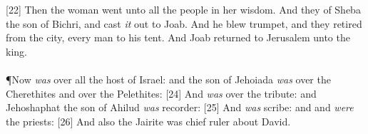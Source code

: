 [22] \textcolor[cmyk]{0.99998,1,0,0}{Then the woman went unto all the people in her wisdom. And they  of Sheba the son of Bichri, and cast \emph{it} out to Joab. And he blew  trumpet, and they retired from the city, every man to his tent. And Joab returned to Jerusalem unto the king.}\\
\\
\P \textcolor[cmyk]{0.99998,1,0,0}{Now  \emph{was} over all the host of Israel: and  the son of Jehoiada \emph{was} over the Cherethites and over the Pelethites:}
[24] \textcolor[cmyk]{0.99998,1,0,0}{And  \emph{was} over the tribute: and Jehoshaphat the son of Ahilud \emph{was} recorder:}
[25] \textcolor[cmyk]{0.99998,1,0,0}{And  \emph{was} scribe: and  and  \emph{were} the priests:}
[26] \textcolor[cmyk]{0.99998,1,0,0}{And  also the Jairite was  chief ruler about David.}